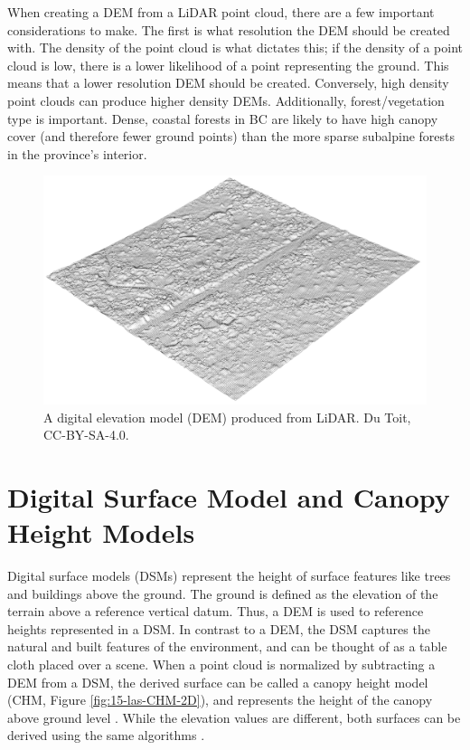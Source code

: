 \documentclass[
]{book}
\begin{document}
When creating a DEM from a LiDAR point cloud, there are a few important considerations to make. The first is what resolution the DEM should be created with. The density of the point cloud is what dictates this; if the density of a point cloud is low, there is a lower likelihood of a point representing the ground. This means that a lower resolution DEM should be created. Conversely, high density point clouds can produce higher density DEMs. Additionally, forest/vegetation type is important. Dense, coastal forests in BC are likely to have high canopy cover (and therefore fewer ground points) than the more sparse subalpine forests in the province's interior.

\begin{figure}
\includegraphics[width=0.7\linewidth]{images/15-las-dem} \caption{A digital elevation model (DEM) produced from LiDAR. Du Toit, CC-BY-SA-4.0.}\label{fig:15-las-dem}
\end{figure}

\section{Digital Surface Model and Canopy Height Models}\label{digital-surface-model-and-canopy-height-models}

Digital surface models (DSMs) represent the height of surface features like trees and buildings above the ground. The ground is defined as the elevation of the terrain above a reference vertical datum. Thus, a DEM is used to reference heights represented in a DSM. In contrast to a DEM, the DSM captures the natural and built features of the environment, and can be thought of as a table cloth placed over a scene. When a point cloud is normalized by subtracting a DEM from a DSM, the derived surface can be called a canopy height model (CHM, Figure \ref{fig:15-las-CHM-2D}), and represents the height of the canopy above ground level \citep{white_best_2013}. While the elevation values are different, both surfaces can be derived using the same algorithms \citep{roussel_lidr_2021}.
\end{document}
